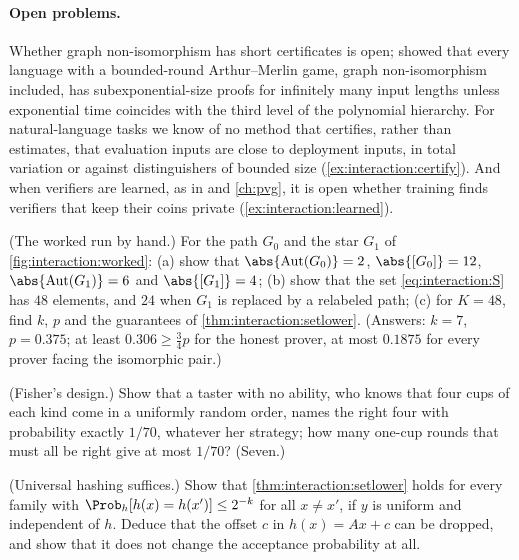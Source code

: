 \begin{refsection}
\paragraph{Open problems.} Whether graph non-isomorphism has short certificates is open; \textcite{KlivansVanMelkebeek2002} showed that every language with a bounded-round Arthur--Merlin game, graph non-isomorphism included, has subexponential-size proofs for infinitely many input lengths unless exponential time coincides with the third level of the polynomial hierarchy. For natural-language tasks we know of no method that certifies, rather than estimates, that evaluation inputs are close to deployment inputs, in total variation or against distinguishers of bounded size (\cref{ex:interaction:certify}). And when verifiers are learned, as in \textcite{HammondAdamDay2025} and \cref{ch:pvg}, it is open whether training finds verifiers that keep their coins private (\cref{ex:interaction:learned}).

\begin{exercises}
\item \consolidation (The worked run by hand.) For the path $G_0$ and the star $G_1$ of \cref{fig:interaction:worked}: (a) show that $\abs{\interactionaut(G_0)}=2$, $\abs{[G_0]}=12$, $\abs{\interactionaut(G_1)}=6$ and $\abs{[G_1]}=4$; (b) show that the set \eqref{eq:interaction:S} has $48$ elements, and $24$ when $G_1$ is replaced by a relabeled path; (c) for $K=48$, find $k$, $p$ and the guarantees of \cref{thm:interaction:setlower}. (Answers: $k=7$, $p=0.375$; at least $0.306\ge\frac34p$ for the honest prover, at most $0.1875$ for every prover facing the isomorphic pair.)\label{ex:interaction:byhand}

\item \consolidation (Fisher's design.) Show that a taster with no ability, who knows that four cups of each kind come in a uniformly random order, names the right four with probability exactly $1/70$, whatever her strategy; how many one-cup rounds that must all be right give at most $1/70$? (Seven.)\label{ex:interaction:fisher}

\item \consolidation (Universal hashing suffices.) Show that \cref{thm:interaction:setlower} holds for every family with $\Prob_h[h(x)=h(x')]\le2^{-k}$ for all $x\ne x'$, if $y$ is uniform and independent of $h$. Deduce that the offset $c$ in $h(x)=Ax+c$ can be dropped, and show that it does not change the acceptance probability at all.\label{ex:interaction:universal}


\end{exercises}
\end{refsection}
